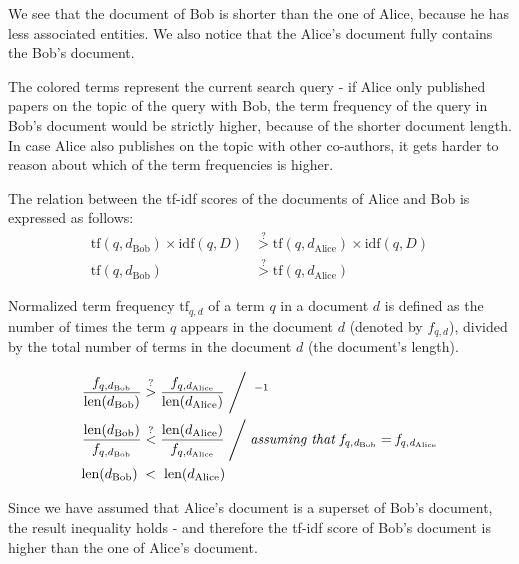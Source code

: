 We see that the document of Bob is shorter than the one of Alice, because he has less associated entities. We also notice that the Alice's document fully contains the Bob's document.
    
The colored terms represent the current search query - if Alice only published papers on the topic of the query with Bob, the term frequency of the 
query in Bob's document would be strictly higher, because of the shorter document length.
In case Alice also publishes on the topic with other co-authors, it gets harder to reason about which of the term frequencies is higher.

The relation between the tf-idf scores of the documents of Alice and Bob is expressed as follows:
\begin{subequations}
\begin{align}
\text{tf}(q, d_{\text{Bob}}) \times \text{idf}(q, D) &\stackrel{?}{>} \text{tf}(q, d_{\text{Alice}}) \times \text{idf}(q, D) \\
\text{tf}(q, d_{\text{Bob}}) &\stackrel{?}{>} \text{tf}(q, d_{\text{Alice}})
\end{align}
\end{subequations}

Normalized term frequency $\text{tf}_{q,d}$ of a term $q$ in a document $d$ is defined as the number of times the term $q$ appears in the document $d$ (denoted by $f_{q,d}$),
divided by the total number of terms in the document $d$ (the document's length).

\begin{subequations}
\begin{align}
\frac{f_{q, d_{\text{Bob}}}}{\text{len}(d_{\text{Bob}})} &\stackrel{?}{>} \frac{f_{q, d_{\text{Alice}}}}{\text{len}(d_{\text{Alice}})} \Biggm/ \;^{-1} \\
\frac{\text{len}(d_{\text{Bob}})}{f_{q, d_{\text{Bob}}}} &\stackrel{?}{<} \frac{\text{len}(d_{\text{Alice}})}{f_{q, d_{\text{Alice}}}} \Biggm/ \textit{assuming that } \mathit{f_{q, d_{\text{Bob}}} = f_{q, d_{\text{Alice}}}} \label{eq:51assumption}\\
\text{len}(d_{\text{Bob}}) \;&<\;\text{len}(d_{\text{Alice}})
\end{align}
\end{subequations}

Since we have assumed that Alice's document is a superset of Bob's document, the result inequality holds - and therefore the tf-idf score of Bob's document is higher than the one of Alice's document.

